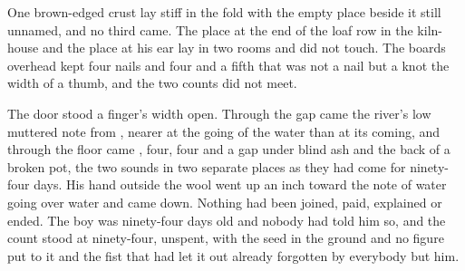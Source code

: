 One brown-edged crust lay stiff in the fold with the empty place beside it still unnamed, and no third came. The place at the end of the loaf row in the kiln-house and the place at his ear lay in two rooms and did not touch. The boards overhead kept four nails and four and a fifth that was not a nail but a knot the width of a thumb, and the two counts did not meet.

The door stood a finger's width open. Through the gap came the river's low muttered note from , nearer at the going of the water than at its coming, and through the floor came , four, four and a gap under blind ash and the back of a broken pot, the two sounds in two separate places as they had come for ninety-four days. His hand outside the wool went up an inch toward the note of water going over water and came down. Nothing had been joined, paid, explained or ended. The boy was ninety-four days old and nobody had told him so, and the count stood at ninety-four, unspent, with the seed in the ground and no figure put to it and the fist that had let it out already forgotten by everybody but him.
